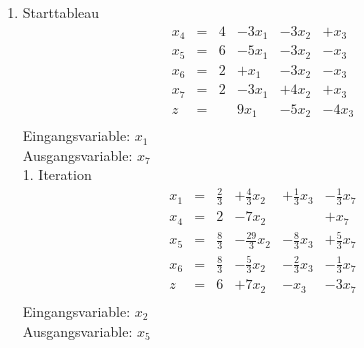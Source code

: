 \documentclass[a4paper]{scrartcl}
\begin{document}
\begin{enumerate}
\begin{enumerate}
            \item
                Starttableau
                \begin{equation}
                    \begin{array}{rcrrrr}
                        x_4 & = & 4 & -3x_1 & -3x_2 & +x_3 \\
                        x_5 & = & 6 & -5x_1 & -3x_2 & -x_3 \\
                        x_6 & = & 2 &  +x_1 & -3x_2 & -x_3 \\
                        x_7 & = & 2 & -3x_1 & +4x_2 & +x_3 \\
                        \hline
                        z   & = &   & 9x_1 & -5x_2 & -4x_3 \\
                    \end{array}
                \end{equation}
                Eingangsvariable: $x_1$ \\
                Ausgangsvariable: $x_7$ \\

                1. Iteration
                \begin{equation}
                    \begin{array}{rcrrrr}
                        x_1 & = & \frac{2}{3} & +\frac{4}{3}x_2 & +\frac{1}{3}x_3 & -\frac{1}{3}x_7 \\
                        x_4 & = & 2 & -7x_2 &  & +x_7 \\
                        x_5 & = & \frac{8}{3} & -\frac{29}{3}x_2 & -\frac{8}{3}x_3 & +\frac{5}{3}x_7 \\
                        x_6 & = & \frac{8}{3} & -\frac{5}{3}x_2 & -\frac{2}{3}x_3 & -\frac{1}{3}x_7 \\
                        \hline
                        z   & = & 6 & +7x_2 & -x_3 & -3x_7 \\
                    \end{array}
                \end{equation}
                Eingangsvariable: $x_2$ \\
                Ausgangsvariable: $x_5$ \\


\end{enumerate}
\end{enumerate}
\end{document}
